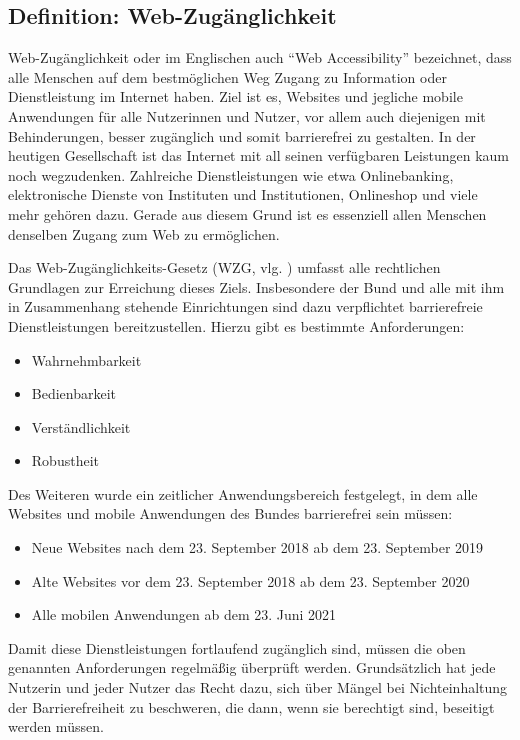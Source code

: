 \subsection{Definition: Web-Zugänglichkeit}
Web-Zugänglichkeit oder im Englischen auch ``Web Accessibility'' bezeichnet, dass alle Menschen auf dem bestmöglichen Weg Zugang zu Information 
oder Dienstleistung im Internet haben. Ziel ist es, Websites und jegliche mobile Anwendungen für alle Nutzerinnen und Nutzer, vor allem auch diejenigen mit
Behinderungen, besser zugänglich und somit barrierefrei zu gestalten. In der heutigen Gesellschaft ist das Internet mit all seinen verfügbaren Leistungen 
kaum noch wegzudenken. Zahlreiche Dienstleistungen wie etwa Onlinebanking, elektronische Dienste von Instituten und Institutionen, Onlineshop 
und viele mehr gehören dazu. Gerade aus diesem Grund ist es essenziell allen Menschen denselben Zugang zum Web zu ermöglichen.

Das Web-Zugänglichkeits-Gesetz (WZG, vlg. \cite{ris_wzg_2020}) umfasst alle rechtlichen Grundlagen 
zur Erreichung dieses Ziels. Insbesondere der Bund und alle mit ihm in Zusammenhang stehende Einrichtungen sind dazu verpflichtet barrierefreie Dienstleistungen
bereitzustellen. Hierzu gibt es bestimmte Anforderungen:

\begin{itemize}
    \item Wahrnehmbarkeit
    \item Bedienbarkeit
    \item Verständlichkeit
    \item Robustheit
\end{itemize}

Des Weiteren wurde ein zeitlicher Anwendungsbereich festgelegt, in dem alle Websites und mobile Anwendungen des Bundes barrierefrei sein müssen:

\begin{itemize}
    \item Neue Websites nach dem 23. September 2018 ab dem 23. September 2019
    \item Alte Websites vor dem 23. September 2018 ab dem 23. September 2020
    \item Alle mobilen Anwendungen ab dem 23. Juni 2021
\end{itemize}

Damit diese Dienstleistungen fortlaufend zugänglich sind, müssen die oben genannten Anforderungen regelmäßig überprüft werden. Grundsätzlich hat jede
Nutzerin und jeder Nutzer das Recht dazu, sich über Mängel bei Nichteinhaltung der Barrierefreiheit zu beschweren, die dann, wenn sie berechtigt sind, beseitigt
werden müssen. 


